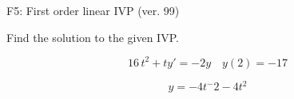 \begin{exercise}
  \begin{exerciseTitle}F5: First order linear IVP (ver. 99)\end{exerciseTitle}
  \begin{exerciseStatement}
    
Find the solution to the given IVP.

    
\[16 \, t^{2} +ty'= -2 y \hspace{1em} y( 2 ) = -17\]

  \end{exerciseStatement}
  \begin{exerciseAnswer}
    
\[y= -4 t^ -2 -4 t^{2}\]

  \end{exerciseAnswer}
\end{exercise}
